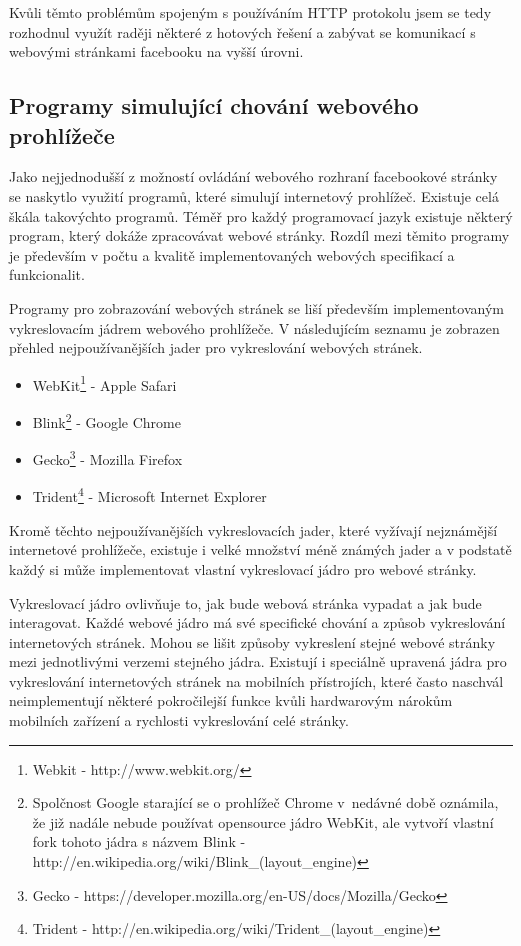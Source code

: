 \documentclass[thesis=M,czech]{FITthesis}[2013/05/10]
\begin{document}
Kvůli těmto problémům spojeným s používáním HTTP protokolu jsem se tedy rozhodnul využít raději některé z hotových řešení a zabývat se komunikací s webovými stránkami facebooku na vyšší úrovni. 

\subsection{Programy simulující chování webového prohlížeče}

Jako nejjednodušší z možností ovládání webového rozhraní facebookové stránky se naskytlo využití programů, které simulují internetový prohlížeč. Existuje celá škála takovýchto programů. Téměř pro každý programovací jazyk existuje některý program, který dokáže zpracovávat webové stránky. Rozdíl mezi těmito programy je především v počtu a kvalitě implementovaných webových specifikací a funkcionalit.

Programy pro zobrazování webových stránek se liší především implementovaným vykreslovacím jádrem webového prohlížeče. V následujícím seznamu je zobrazen přehled nejpoužívanějších jader pro vykreslování webových stránek.

\begin{itemize}
  \item WebKit\footnote{Webkit - http://www.webkit.org/} - Apple Safari
  \item Blink\footnote{Spolčnost Google starající se o prohlížeč Chrome v~nedávné době oznámila, že již nadále nebude používat opensource jádro WebKit, ale vytvoří vlastní fork tohoto jádra s názvem Blink -  http://en.wikipedia.org/wiki/Blink\_(layout\_engine)} - Google Chrome
  \item Gecko\footnote{Gecko - https://developer.mozilla.org/en-US/docs/Mozilla/Gecko} - Mozilla Firefox
  \item Trident\footnote{Trident - http://en.wikipedia.org/wiki/Trident\_(layout\_engine)} - Microsoft Internet Explorer
\end{itemize}
 
Kromě těchto nejpoužívanějších vykreslovacích jader, které vyžívají nejznámější internetové prohlížeče, existuje i velké množství méně známých jader a v podstatě každý si může implementovat vlastní vykreslovací jádro pro webové stránky.

Vykreslovací jádro ovlivňuje to, jak bude webová stránka vypadat a jak bude interagovat. Každé webové jádro má své specifické chování a způsob vykreslování internetových stránek. Mohou se lišit způsoby vykreslení stejné webové stránky mezi jednotlivými verzemi stejného jádra. Existují i speciálně upravená jádra pro vykreslování internetových stránek na mobilních přístrojích, které často naschvál neimplementují některé pokročilejší funkce kvůli hardwarovým nárokům mobilních zařízení a rychlosti vykreslování celé stránky.
\end{document}
